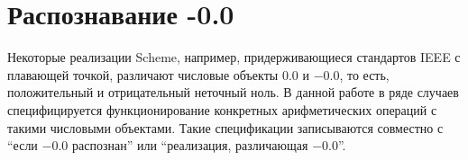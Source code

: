\section{Распознавание -0.0}\vspace{-2mm}

 Некоторые реализации Scheme, например, придерживающиеся стандартов IEEE с
плавающей точкой, различают числовые объекты $0.0$ и $-0.0$, то есть, положительный и
отрицательный неточный ноль. В данной работе в ряде случаев специфицируется функционирование
конкретных арифметических операций с такими числовыми объектами. Такие спецификации записываются
совместно с ``если $-0.0$ распознан'' или ``реализация, различающая $-0.0$''.\vspace{-4mm}

